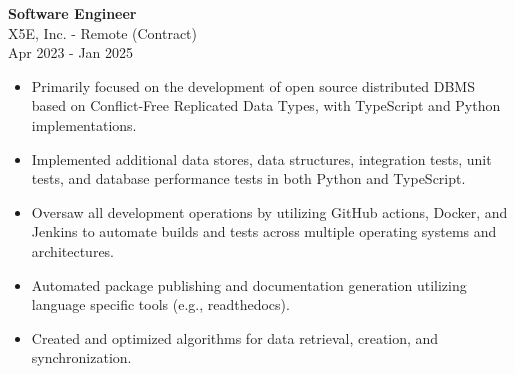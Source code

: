 \documentclass[a4paper,10pt]{article}
\begin{document}
\begin{flushleft}
  \textbf{Software Engineer} \\
  X5E, Inc. - Remote (Contract) \\
  Apr 2023 - Jan 2025
  \begin{itemize}
    \item Primarily focused on the development of open source distributed DBMS based on Conflict-Free Replicated Data Types, with TypeScript and Python implementations.
    \item Implemented additional data stores, data structures, integration tests, unit tests, and database performance tests in both Python and TypeScript.
    \item Oversaw all development operations by utilizing GitHub actions, Docker, and Jenkins to automate builds and tests across multiple operating systems and architectures.
    \item Automated package publishing and documentation generation utilizing language specific tools (e.g., readthedocs).
    \item Created and optimized algorithms for data retrieval, creation, and synchronization.
  \end{itemize}
\end{flushleft}
\end{document}
